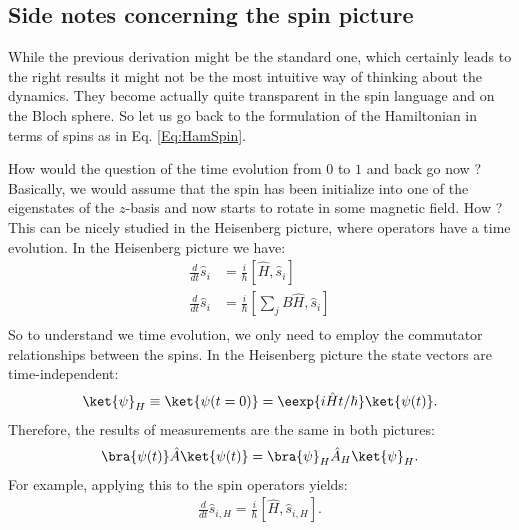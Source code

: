 \subsection{Side notes concerning the spin picture}

While the previous derivation might be the standard one, which certainly leads to the right results it might not be the most intuitive way of thinking about the dynamics. They become actually quite transparent in the spin language and on the Bloch sphere. So let us go back to the formulation of the Hamiltonian in terms of spins as in Eq. \eqref{Eq:HamSpin}.

How would the question of the time evolution from $0$ to $1$ and back go now ? Basically, we would assume that the spin has been initialize into one of the eigenstates of the $z$-basis and now starts to rotate in some magnetic field. How ? This can be nicely studied in the Heisenberg picture, where operators have a time evolution. In the Heisenberg picture we have:
\begin{align}
\frac{d}{dt} \hat{s}_i &= \frac{i}{\hbar}\left[\hat{H},\hat{s}_i\right]\\
\frac{d}{dt} \hat{s}_i &= \frac{i}{\hbar}\left[\sum_j B\hat{H},\hat{s}_i\right]\\
 \end{align}
So to understand we time evolution, we only need to employ the commutator relationships between the spins.
In the Heisenberg picture the state vectors are time-in\-de\-pen\-dent:
\begin{align}
	\ket{\psi}_H \equiv \ket{\psi(t=0)}=\eexp{i{\hat{H}}t/{\hbar}} \ket{\psi(t)}.
\end{align}
Therefore, the results of measurements are the same in both pictures:
\begin{align}
\bra{\psi(t)}\hat{A}\ket{\psi(t)} = \bra{\psi}_H \hat{A}_H \ket{\psi}_H.
\end{align}
For example, applying this to the spin operators yields:
\begin{align}						\frac{d}{dt}\hat{s}_{i,H}=\frac{i}{\hbar}\left[\hat{H},\hat{s}_{i,H}\right].
\end{align}